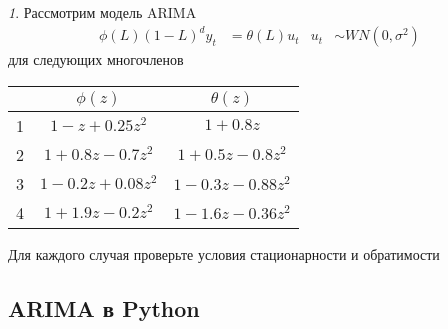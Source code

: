 \documentclass[12pt]{article}
\theoremstyle{remark}
\newtheorem{exercise}{}[subsection]
\begin{document}
\begin{exercise}
Рассмотрим модель ARIMA
\begin{align*}
	\phi(L)(1-L)^dy_t&=\theta(L)u_t & u_t&\sim WN(0,\sigma^2)
\end{align*}
для следующих многочленов
\begin{center}
	\begin{tabular}{l|c|c}
		\textnumero & \(\phi(z)\) & \(\theta(z)\) \\ \hline
		1 & \(1-z+0.25z^2\) & \(1+0.8z\) \\ \hline
		2 & \(1+0.8z-0.7z^2\) & \(1+0.5z-0.8z^2\) \\ \hline
		3 & \(1-0.2z+0.08z^2\) & \(1-0.3z-0.88z^2\) \\ \hline
		4 & \(1+1.9z-0.2z^2\) & \(1-1.6z-0.36z^2\) \\ \hline
	\end{tabular}
\end{center}
Для каждого случая проверьте условия стационарности и обратимости
\end{exercise}

\subsection{ARIMA в Python}
\end{document}
